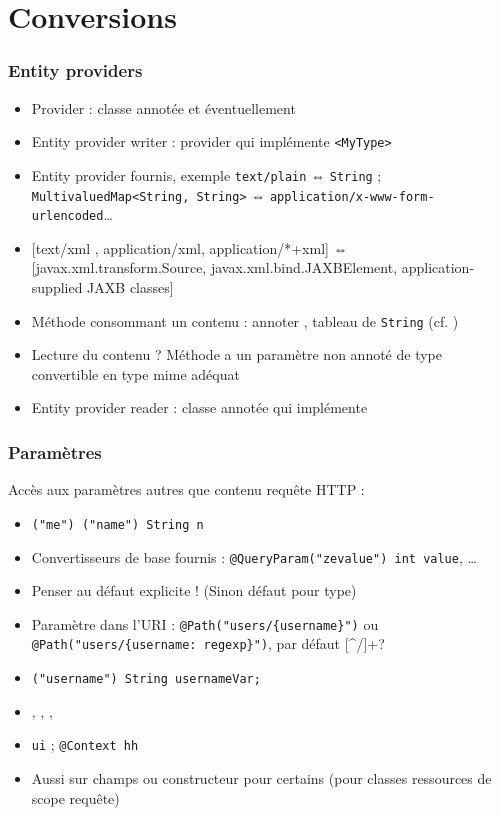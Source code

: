 \documentclass[english, french]{beamer}
\begin{document}
\section{Conversions}
\begin{frame}
	\frametitle{Entity providers}
	\begin{itemize}
		\item Provider : classe annotée  et {\tiny éventuellement} 
		\item Entity provider \og{}writer\fg{} : provider qui implémente \texttt{<MyType>}
		\item Entity provider fournis, exemple \texttt{text/plain} ⇔ \texttt{String} ; \texttt{MultivaluedMap<String, String>} ⇔ \texttt{application/x-www-form-urlencoded}…
		\item{} {\tiny [text/xml , application/xml, application/*+xml] ⇔ [javax.xml.transform.Source, javax.xml.bind.JAXBElement, application-supplied JAXB classes]} %
		\item Méthode consommant un contenu : annoter , tableau de \texttt{String} (cf. )
		\item Lecture du contenu ? \pause Méthode a un paramètre non annoté de type convertible en type mime adéquat \pause
		\item Entity provider \og{}reader\fg{} : classe annotée  qui implémente 
	\end{itemize}
\end{frame}

\begin{frame}
	\frametitle{Paramètres}
	Accès aux paramètres autres que contenu requête HTTP :
	\begin{itemize}
		\item \texttt{("me") ("name") String n}
		\item Convertisseurs de base fournis : \texttt{@QueryParam("zevalue") int value}, …
		\item Penser au défaut explicite ! (Sinon défaut pour type)
		\item Paramètre dans l’URI : \texttt{@Path("users/\{username\}")} {\tiny ou \texttt{@Path("users/\{username: regexp\}")}, par défaut [\^{}/]+?}
		\item \texttt{("username") String usernameVar;}
		\item {}, , , 
		\item {}  \texttt{ui} ; \texttt{@Context  hh}
		\item Aussi sur champs {\tiny ou constructeur pour certains} (pour classes ressources de scope requête)
	\end{itemize}
\end{frame}
\end{document}
